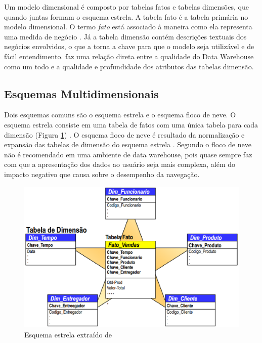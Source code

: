 Um modelo dimensional é composto por tabelas fatos e tabelas dimensões, que quando juntas formam o esquema estrela. A tabela fato é a tabela primária no modelo dimensional. O termo \textit{fato} está associado à maneira como ela representa uma medida de negócio \cite{Kimball2002}. Já a tabela dimensão contém descrições textuais dos negócios envolvidos, o que a torna a chave para que o modelo seja utilizável e de fácil entendimento.  faz uma relação direta entre a qualidade do Data Warehouse como um todo e a qualidade e profundidade dos atributos das tabelas dimensão.

\subsection{Esquemas Multidimensionais}

Dois esquemas comuns são o esquema estrela e o esquema floco de neve. O esquema estrela consiste em uma tabela de fatos com uma única tabela para cada dimensão (Figura \ref{fig:estrela}) \cite{elmasri_sistemas_2011}. O esquema floco de neve é resultado da normalização e expansão das tabelas de dimensão do esquema estrela \cite{ballard_dimensional_2006}. Segundo  o floco de neve não é recomendado em uma ambiente de data warehouse, pois quase sempre faz com que a apresentação dos dados ao usuário seja mais complexa, além do impacto negativo que causa sobre o desempenho da navegação.

 
\begin{figure}[h!]
\centering
\includegraphics[keepaspectratio=false,scale=0.50]{figuras/figuras_matheus/star.eps}
\caption{Esquema estrela extraído de }
\label{fig:estrela}
\end{figure}
\FloatBarrier


